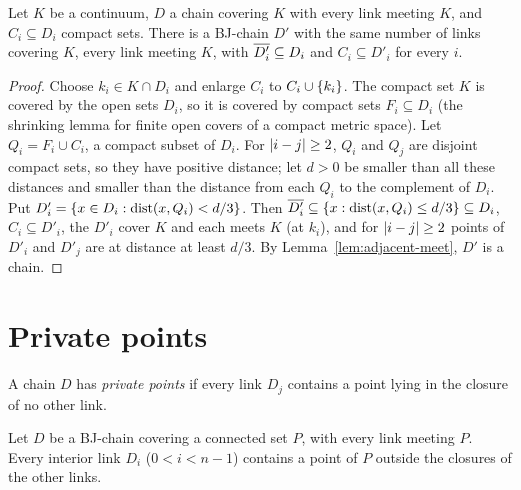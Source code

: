 
\begin{theorem}\label{thm:shrink}
Let $K$ be a continuum, $D$ a chain covering $K$ with every link meeting $K$, and $C_i\subseteq D_i$ compact sets. There is a BJ-chain $D'$ with the same
number of links covering $K$, every link meeting $K$, with $\overline{D'_i}\subseteq D_i$ and $C_i\subseteq D'_i$ for every $i$.
\end{theorem}

\begin{proof}
Choose $k_i\in K\cap D_i$ and enlarge $C_i$ to $C_i\cup\left\{ k_i \right\}$. The compact set $K$ is covered by the open sets $D_i$, so it is covered by compact sets
$F_i\subseteq D_i$ (the shrinking lemma for finite open covers of a compact metric space). Let $Q_i=F_i\cup C_i$, a compact subset of $D_i$. For
$\left\lvert i-j\right\rvert\ge2$, $Q_i$ and $Q_j$ are disjoint compact sets, so they have positive distance; let $d>0$ be smaller than all these distances and smaller than
the distance from each $Q_i$ to the complement of $D_i$. Put $D'_i=\left\{ x\in D_i:\operatorname{dist}(x,Q_i)<d/3 \right\}$. Then $\overline{D'_i}\subseteq\left\{ x:\operatorname{dist}(x,Q_i)\le
d/3 \right\}\subseteq D_i$, $C_i\subseteq D'_i$, the $D'_i$ cover $K$ and each meets $K$ (at $k_i$), and for $\left\lvert i-j\right\rvert\ge2$ points of $D'_i$ and $D'_j$ are at distance
at least $d/3$. By Lemma~\ref{lem:adjacent-meet}, $D'$ is a chain.
\end{proof}


\section{Private points}

\begin{definition}\label{def:private}
A chain $D$ has \emph{private points} if every link $D_j$ contains a point lying in the closure of no other link.
\end{definition}


\begin{proposition}\label{prop:private-interior}
Let $D$ be a BJ-chain covering a connected set $P$, with every link meeting $P$. Every interior link $D_i$ ($0<i<n-1$) contains a point of $P$ outside the
closures of the other links.
\end{proposition}

